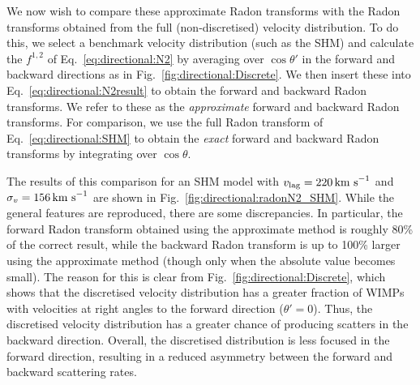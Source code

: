 We now wish to compare these approximate Radon transforms with the Radon transforms obtained from the full (non-discretised) velocity distribution. To do this, we select a benchmark velocity distribution (such as the SHM) and calculate the $f^{1,2}$ of Eq.~\ref{eq:directional:N2} by averaging over $\cos\theta'$ in the forward and backward directions as in Fig.~\ref{fig:directional:Discrete}. We then insert these into Eq.~\ref{eq:directional:N2result} to obtain the forward and backward Radon transforms. We refer to these as the \textit{approximate} forward and backward Radon transforms. For comparison, we use the full Radon transform of Eq.~\ref{eq:directional:SHM} to obtain the \textit{exact} forward and backward Radon transforms by integrating over $\cos\theta$.


The results of this comparison for an SHM model with $v_\textrm{lag} = 220 \,\textrm{km s}^{-1}$ and $\sigma_v = 156 \,\textrm{km s}^{-1}$ are shown in Fig.~\ref{fig:directional:radonN2_SHM}. While the general features are reproduced, there are some discrepancies. In particular, the forward Radon transform obtained using the approximate method is roughly 80\% of the correct result, while the backward Radon transform is up to 100\% larger using the approximate method (though only when the absolute value becomes small). The reason for this is clear from Fig.~\ref{fig:directional:Discrete}, which shows that the discretised velocity distribution has a greater fraction of WIMPs with velocities at right angles to the forward direction ($\theta' = 0$). Thus, the discretised velocity distribution has a greater chance of producing scatters in the backward direction. Overall, the discretised distribution is less focused in the forward direction, resulting in a reduced asymmetry between the forward and backward scattering rates.

